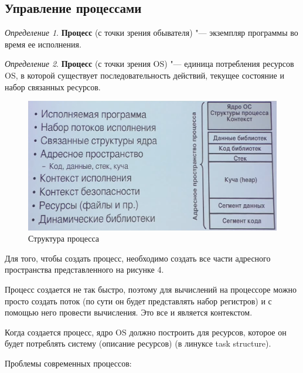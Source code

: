 \documentclass[bachelor, och, book]{SCWorks}
\theoremstyle{remark}
\newtheorem{definition}{Определение}
\begin{document}
    \subsection{Управление процессами}

    \begin{definition}
        \textbf{Процесс} (с точки зрения обывателя) "--- экземпляр программы во время ее исполнения.
    \end{definition}
    
    \begin{definition}
        \textbf{Процесс} (с точки зрения OS) "--- единица потребления ресурсов OS, в которой существует последовательность действий, текущее состояние и набор связанных ресурсов.
    \end{definition}
    
    \begin{figure}[H]
        \begin{center}
            \includegraphics[scale=0.4]{res/process-structure.png}
            \caption{Структура процесса}
        \end{center}
    \end{figure}

    Для того, чтобы создать процесс, необходимо создать все части адресного пространства представленного на рисунке 4.

    Процесс создается не так быстро, поэтому для вычислений на процессоре можно просто создать поток (по сути он будет представлять набор регистров) и с помощью него провести вычисления. Это все и является контекстом.

    Когда создается процесс, ядро OS должно построить для ресурсов, которое он будет потреблять систему (описание ресурсов) (в линуксе task structure). 

    Проблемы современных процессов:
\end{document}
